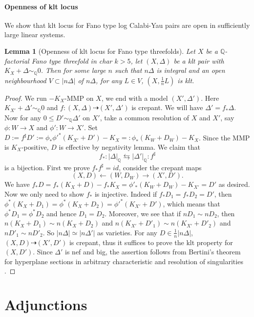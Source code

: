 \documentclass[letterpaper,reqno,12pt]{amsart}
\newcommand{\tbf}{\textbf}
\numberwithin{equation}{section}
\theoremstyle{plain}
\newtheorem{lemma}[theorem]{Lemma}
\begin{document}
\paragraph{\tbf{Openness of klt locus}}
We show that klt locus for Fano type log Calabi-Yau pairs are open in sufficiently large linear systems.
\begin{lemma}[Openness of klt locus for Fano type threefolds]
\label{kltopen}
    Let $X$ be a ${\mathbb Q}$-factorial Fano type threefold in char $k>5$, let $(X,\Delta)$ be a klt pair with $K_X+\Delta\sim_{\mathbb Q}0$. Then for some large $n$ such that $n\Delta$ is integral and an open neighbourhood $V\subset |n\Delta|$ of $n\Delta$, for any $L\in V$, $(X,\frac{1}{n}L)$ is klt.
\end{lemma}
\begin{proof}
    We run $-K_X$-MMP on $X$, we end with a model $(X',\Delta')$. Here $K_{X'}+\Delta'\sim_{\mathbb Q}0$ and $f:(X,\Delta)\dashrightarrow(X',\Delta')$ is crepant. We will have $\Delta'=f_*\Delta$. Now for any $0\leq D'\sim_{\mathbb Q}\Delta'$ on $X'$, take a common resolution of $X$ and $X'$, say $\phi:W\to X$ and $\phi':W\to X'$. Set $D:=f^\sharp D':=\phi_*\phi'^*(K_{X'}+D')-K_X=:\phi_*(K_W+D_W)-K_X$. Since the MMP is $K_X$-positive, $D$ is effective by negativity lemma. We claim that
    \[f_*:|\Delta|_{\mathbb Q}\leftrightarrows|\Delta'|_{\mathbb Q}:f^\sharp\] is a bijection. First we prove $f_*f^\sharp=id$, consider the crepant maps \[(X,D)\leftarrow (W,D_W)\to(X',D').\]
    We have $f_*D=f_*(K_X+D)-f_*K_X=\phi'_*(K_W+D_W)-K_{X'}=D'$ as desired. Now we only need to show $f_*$ is injective. Indeed if $f_*D_1=f_* D_2=D'$, then $\phi^*(K_X+D_1)=\phi^*(K_X+D_2)=\phi'^*(K_{X'}+D')$, which means that $\phi^*D_1=\phi^*D_2$ and hence $D_1=D_2$. Moreover, we see that if $nD_1\sim nD_2$, then $n(K_X+D_1)\sim n(K_X+D_2)$ and $n(K_{X'}+D'_1)\sim n(K_{X'}+D'_2)$ and $n D'_1\sim nD'_2$. So $|n\Delta|\simeq |n\Delta'|$ as varieties. For any $D\in \frac{1}{n}|n\Delta|$, $(X,D)\dashrightarrow (X',D')$ is crepant, thus it suffices to prove the klt property for $(X,D')$. Since $\Delta'$ is nef and big, the assertion follows from Bertini's theorem for hyperplane sections in arbitrary characteristic and resolution of singularities \cite{BertiniHyperplane}.
\end{proof}



\section{Adjunctions}
\end{document}
